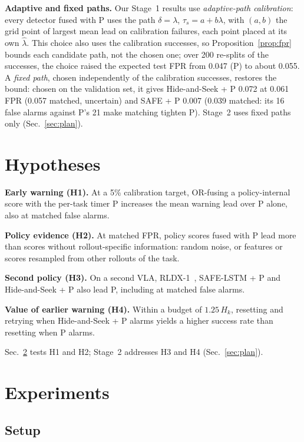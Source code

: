 \documentclass[conference]{IEEEtran}
\begin{document}
\textbf{Adaptive and fixed paths.} Our Stage~1 results use \emph{adaptive-path calibration}:
every detector fused with P uses the path $\delta = \lambda$, $\tau_s = a + b\lambda$, with
$(a, b)$ the grid point of largest mean lead on calibration failures, each point placed at its own
$\hat\lambda$. This choice also uses the calibration successes, so Proposition~\ref{prop:fpr}
bounds each candidate path, not the chosen one; over 200 re-splits of the successes, the choice
raised the expected test FPR from 0.047 (P) to about 0.055. A \emph{fixed path}, chosen
independently of the calibration successes, restores the bound: chosen on the validation set,
it gives Hide-and-Seek + P 0.072 at 0.061 FPR (0.057 matched, uncertain) and SAFE + P 0.007
(0.039 matched: its 16 false alarms against P's 21 make matching tighten P). Stage~2 uses fixed paths
only (Sec.~\ref{sec:plan}).

\section{Hypotheses}
\label{sec:hypotheses}

\textbf{Early warning (H1).} At a 5\% calibration target, OR-fusing a policy-internal score
with the per-task timer P increases the mean warning lead over P alone, also at matched false alarms.

\textbf{Policy evidence (H2).} At matched FPR, policy scores fused with P lead more than scores
without rollout-specific information: random noise, or features or scores resampled from other
rollouts of the task.

\textbf{Second policy (H3).} On a second VLA, RLDX-1~\cite{kim2026rldx}, SAFE-LSTM + P and
Hide-and-Seek + P also lead P, including at matched false alarms.

\textbf{Value of earlier warning (H4).} Within a budget of $1.25\,H_k$, resetting and retrying
when Hide-and-Seek + P alarms yields a higher success rate than resetting when P alarms.

Sec.~\ref{sec:results} tests H1 and H2; Stage~2 addresses H3 and H4 (Sec.~\ref{sec:plan}).

\section{Experiments}
\label{sec:results}

\subsection{Setup}
\label{sec:setup}
\end{document}
